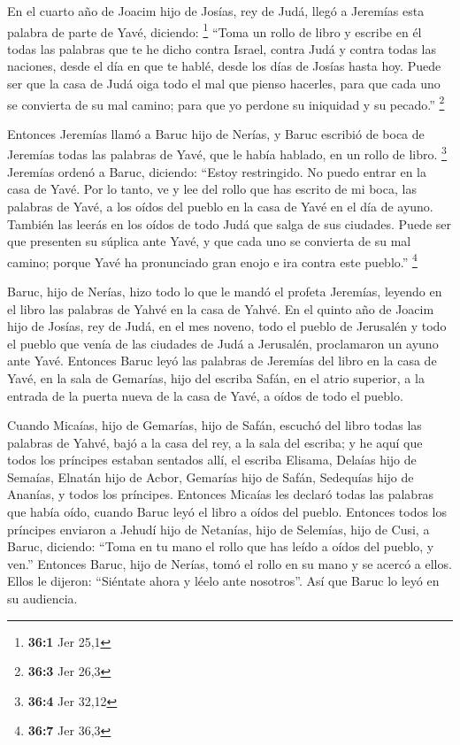 \begin{paracol}{2}
 En el cuarto año de Joacim hijo de Josías, rey de Judá,
llegó a Jeremías esta palabra de parte de Yavé, diciendo: \footnote{\textbf{36:1}
  Jer 25,1}  ``Toma un rollo de libro y escribe en él
todas las palabras que te he dicho contra Israel, contra Judá y contra
todas las naciones, desde el día en que te hablé, desde los días de
Josías hasta hoy.  Puede ser que la casa de Judá oiga todo
el mal que pienso hacerles, para que cada uno se convierta de su mal
camino; para que yo perdone su iniquidad y su pecado.'' \footnote{\textbf{36:3}
  Jer 26,3}

 Entonces Jeremías llamó a Baruc hijo de Nerías, y Baruc
escribió de boca de Jeremías todas las palabras de Yavé, que le había
hablado, en un rollo de libro. \footnote{\textbf{36:4} Jer 32,12}
 Jeremías ordenó a Baruc, diciendo: ``Estoy restringido.
No puedo entrar en la casa de Yavé.  Por lo tanto, ve y
lee del rollo que has escrito de mi boca, las palabras de Yavé, a los
oídos del pueblo en la casa de Yavé en el día de ayuno. También las
leerás en los oídos de todo Judá que salga de sus ciudades.
 Puede ser que presenten su súplica ante Yavé, y que cada
uno se convierta de su mal camino; porque Yavé ha pronunciado gran enojo
e ira contra este pueblo.'' \footnote{\textbf{36:7} Jer 36,3}

 Baruc, hijo de Nerías, hizo todo lo que le mandó el
profeta Jeremías, leyendo en el libro las palabras de Yahvé en la casa
de Yahvé.  En el quinto año de Joacim hijo de Josías, rey
de Judá, en el mes noveno, todo el pueblo de Jerusalén y todo el pueblo
que venía de las ciudades de Judá a Jerusalén, proclamaron un ayuno ante
Yavé.  Entonces Baruc leyó las palabras de Jeremías del
libro en la casa de Yavé, en la sala de Gemarías, hijo del escriba
Safán, en el atrio superior, a la entrada de la puerta nueva de la casa
de Yavé, a oídos de todo el pueblo.

 Cuando Micaías, hijo de Gemarías, hijo de Safán, escuchó
del libro todas las palabras de Yahvé,  bajó a la casa
del rey, a la sala del escriba; y he aquí que todos los príncipes
estaban sentados allí, el escriba Elisama, Delaías hijo de Semaías,
Elnatán hijo de Acbor, Gemarías hijo de Safán, Sedequías hijo de
Ananías, y todos los príncipes.  Entonces Micaías les
declaró todas las palabras que había oído, cuando Baruc leyó el libro a
oídos del pueblo.  Entonces todos los príncipes enviaron
a Jehudí hijo de Netanías, hijo de Selemías, hijo de Cusi, a Baruc,
diciendo: ``Toma en tu mano el rollo que has leído a oídos del pueblo, y
ven.'' Entonces Baruc, hijo de Nerías, tomó el rollo en su mano y se
acercó a ellos.  Ellos le dijeron: ``Siéntate ahora y
léelo ante nosotros''. Así que Baruc lo leyó en su audiencia.


\end{paracol}
